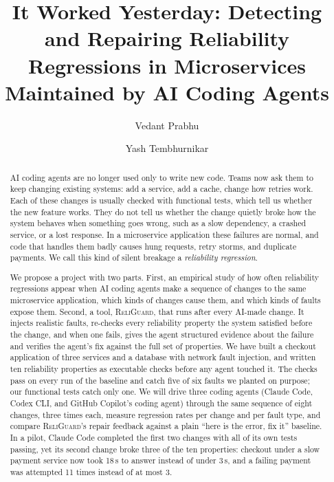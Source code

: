 \documentclass[sigconf,review]{acmart}
\newcommand{\vedantid}{}
\newcommand{\yashid}{}
\begin{document}
\title[Reliability Regressions in AI-Maintained Microservices]{It Worked Yesterday: Detecting and Repairing Reliability Regressions in Microservices Maintained by AI Coding Agents}

\author{Vedant Prabhu\vedantid}

\author{Yash Tembhurnikar\yashid}

\renewcommand{\shortauthors}{Prabhu and Tembhurnikar}

\begin{abstract}
AI coding agents are no longer used only to write new code. Teams
now ask them to keep changing existing systems: add a service, add
a cache, change how retries work. Each of these changes is usually
checked with functional tests, which tell us whether the new feature
works. They do not tell us whether the change quietly broke how
the system behaves when something goes wrong, such as a slow
dependency, a crashed service, or a lost response. In a microservice
application these failures are normal, and code that handles them
badly causes hung requests, retry storms, and duplicate payments.
We call this kind of silent breakage a \emph{reliability regression}.

We propose a project with two parts. First, an empirical study
of how often reliability regressions appear when AI coding agents
make a sequence of changes to the same microservice application,
which kinds of changes cause them, and which kinds of faults
expose them. Second, a tool, \textsc{ReliGuard}, that runs after every
AI-made change. It injects realistic faults, re-checks every reliability
property the system satisfied before the change, and when one fails,
gives the agent structured evidence about the failure and verifies
the agent's fix against the full set of properties. We have built a
checkout application of three services and a database with network
fault injection, and written ten reliability properties as executable
checks before any agent touched it. The checks pass on every run
of the baseline and catch five of six faults we planted on purpose;
our functional tests catch only one.
We will drive three coding agents (Claude Code, Codex CLI, and
GitHub Copilot's coding agent) through the same sequence of eight
changes, three times each, measure regression rates per change and
per fault type, and compare \textsc{ReliGuard}'s repair feedback against
a plain ``here is the error, fix it'' baseline. In a pilot, Claude Code
completed the first two changes with all of its own tests passing,
yet its second change broke three of the ten properties: checkout
under a slow payment service now took 18\,s to answer instead of under
3\,s, and a failing payment was attempted 11 times instead of at most 3.
\end{abstract}
\end{document}
